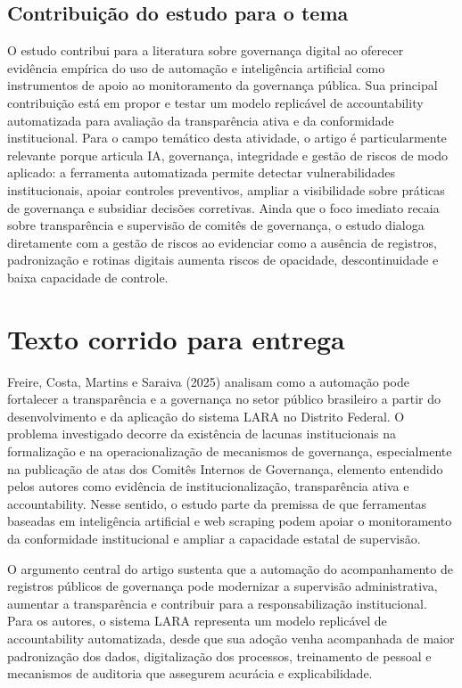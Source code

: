 \documentclass[12pt,a4paper]{article}
\begin{document}
\subsection{Contribuição do estudo para o tema}
\label{sec:org32dc655}

O estudo contribui para a literatura sobre governança digital ao oferecer evidência empírica do uso de automação e inteligência artificial como instrumentos de apoio ao monitoramento da governança pública. Sua principal contribuição está em propor e testar um modelo replicável de accountability automatizada para avaliação da transparência ativa e da conformidade institucional. Para o campo temático desta atividade, o artigo é particularmente relevante porque articula IA, governança, integridade e gestão de riscos de modo aplicado: a ferramenta automatizada permite detectar vulnerabilidades institucionais, apoiar controles preventivos, ampliar a visibilidade sobre práticas de governança e subsidiar decisões corretivas. Ainda que o foco imediato recaia sobre transparência e supervisão de comitês de governança, o estudo dialoga diretamente com a gestão de riscos ao evidenciar como a ausência de registros, padronização e rotinas digitais aumenta riscos de opacidade, descontinuidade e baixa capacidade de controle.

\section{Texto corrido para entrega}
\label{sec:org719bdc0}

Freire, Costa, Martins e Saraiva (2025) analisam como a automação pode fortalecer a transparência e a governança no setor público brasileiro a partir do desenvolvimento e da aplicação do sistema LARA no Distrito Federal. O problema investigado decorre da existência de lacunas institucionais na formalização e na operacionalização de mecanismos de governança, especialmente na publicação de atas dos Comitês Internos de Governança, elemento entendido pelos autores como evidência de institucionalização, transparência ativa e accountability. Nesse sentido, o estudo parte da premissa de que ferramentas baseadas em inteligência artificial e web scraping podem apoiar o monitoramento da conformidade institucional e ampliar a capacidade estatal de supervisão.

O argumento central do artigo sustenta que a automação do acompanhamento de registros públicos de governança pode modernizar a supervisão administrativa, aumentar a transparência e contribuir para a responsabilização institucional. Para os autores, o sistema LARA representa um modelo replicável de accountability automatizada, desde que sua adoção venha acompanhada de maior padronização dos dados, digitalização dos processos, treinamento de pessoal e mecanismos de auditoria que assegurem acurácia e explicabilidade.
\end{document}
